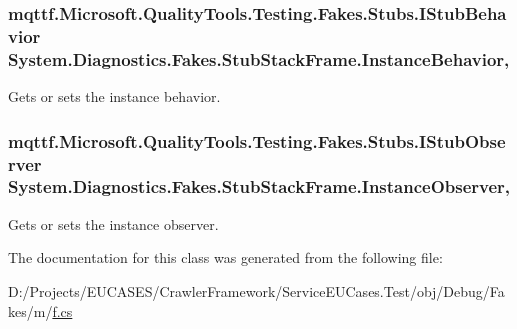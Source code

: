 \hypertarget{class_system_1_1_diagnostics_1_1_fakes_1_1_stub_stack_frame_abf5b73af395cd223312bdd68fd33225f}{
\subsubsection[{Instance\-Behavior}]{\setlength{\rightskip}{0pt plus 5cm}mqttf.\-Microsoft.\-Quality\-Tools.\-Testing.\-Fakes.\-Stubs.\-I\-Stub\-Behavior System.\-Diagnostics.\-Fakes.\-Stub\-Stack\-Frame.\-Instance\-Behavior\hspace{0.3cm}{\ttfamily [get]}, {\ttfamily [set]}}}\label{class_system_1_1_diagnostics_1_1_fakes_1_1_stub_stack_frame_abf5b73af395cd223312bdd68fd33225f}


Gets or sets the instance behavior.

\hypertarget{class_system_1_1_diagnostics_1_1_fakes_1_1_stub_stack_frame_add0dc99adc801186d332eb14ae463359}{
\subsubsection[{Instance\-Observer}]{\setlength{\rightskip}{0pt plus 5cm}mqttf.\-Microsoft.\-Quality\-Tools.\-Testing.\-Fakes.\-Stubs.\-I\-Stub\-Observer System.\-Diagnostics.\-Fakes.\-Stub\-Stack\-Frame.\-Instance\-Observer\hspace{0.3cm}{\ttfamily [get]}, {\ttfamily [set]}}}\label{class_system_1_1_diagnostics_1_1_fakes_1_1_stub_stack_frame_add0dc99adc801186d332eb14ae463359}


Gets or sets the instance observer.



The documentation for this class was generated from the following file\-:\begin{DoxyCompactItemize}
\item 
D\-:/\-Projects/\-E\-U\-C\-A\-S\-E\-S/\-Crawler\-Framework/\-Service\-E\-U\-Cases.\-Test/obj/\-Debug/\-Fakes/m/\hyperlink{m_2f_8cs}{f.\-cs}\end{DoxyCompactItemize}
